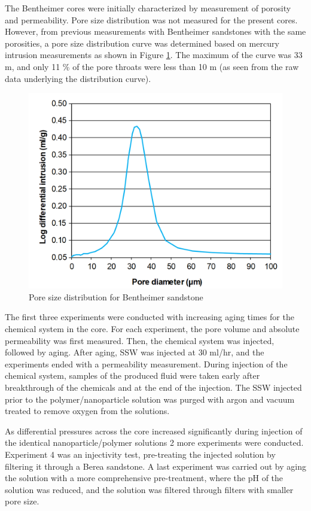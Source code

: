 The Bentheimer cores were initially characterized by measurement of porosity and permeability. Pore size distribution was not measured for the present cores. However, from previous measurements with Bentheimer sandstones with the same porosities, a pore size distribution curve was determined based on mercury intrusion measurements as shown in Figure \ref{cht:poreSizeDist}. The maximum of the curve was 33 \micro m, and only 11 \% of the pore throats were less than 10 \micro m (as seen from the raw data underlying the distribution curve).

\begin{figure}
    \centering
    \includegraphics[width=.7\textwidth]{img/cht/poreSizeDist.png}
    \caption{Pore size distribution for Bentheimer sandstone}
    \label{cht:poreSizeDist}
\end{figure}

The first three experiments were conducted with increasing aging times for the chemical system
in the core. For each experiment, the pore volume and absolute permeability was first measured. Then, the chemical system was injected, followed by aging. After aging, SSW was injected at 30 ml/hr, and the experiments ended with a permeability measurement. During injection of the chemical system, samples of the produced fluid were taken early after breakthrough of the chemicals and at the end of the injection. The SSW injected prior to the polymer/nanoparticle solution was purged with argon and vacuum treated to remove oxygen from the solutions.

As differential pressures across the core increased significantly during injection of the identical nanoparticle/polymer solutions 2 more experiments were conducted. Experiment 4 was an injectivity test, pre-treating the injected solution by filtering it through a Berea sandstone. A last experiment was carried out by aging the solution with a more comprehensive pre-treatment, where the pH of the solution was reduced, and the solution was filtered through filters with smaller pore size.

